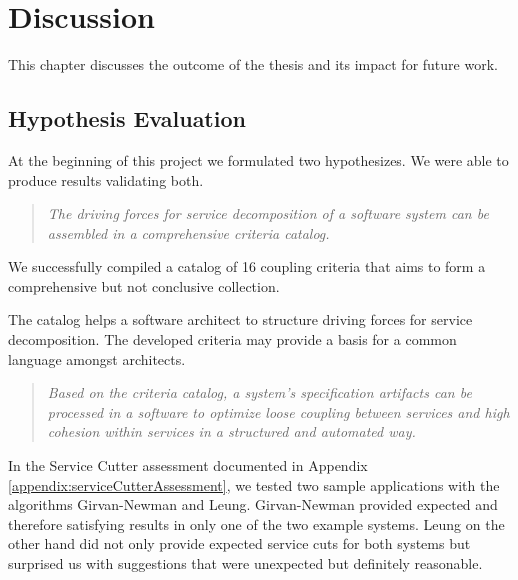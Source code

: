 \chapter{Discussion}

This chapter discusses the outcome of the thesis and its impact for future work.

\section{Hypothesis Evaluation}

At the beginning of this project we formulated two hypothesizes. We were able to produce results validating both.

\begin{quote}
	\textit{The driving forces for service decomposition of a software system can be assembled in a comprehensive criteria catalog.}
\end{quote}

We successfully compiled a catalog of 16 coupling criteria that aims to form a comprehensive but not conclusive collection. 

The catalog helps a software architect to structure driving forces for service decomposition. The developed criteria may provide a basis for a common language amongst architects. 


\begin{quote}
	\textit{Based on the criteria catalog, a system's specification artifacts can be processed in a software to optimize loose coupling between services and high cohesion within services in a structured and automated way.}
\end{quote}

In the Service Cutter assessment documented in Appendix \ref{appendix:serviceCutterAssessment}, we tested two sample applications with the algorithms Girvan-Newman and Leung. Girvan-Newman provided expected and therefore satisfying results in only one of the two example systems. Leung on the other hand did not only provide expected service cuts for both systems but surprised us with suggestions that were unexpected but definitely reasonable.  

